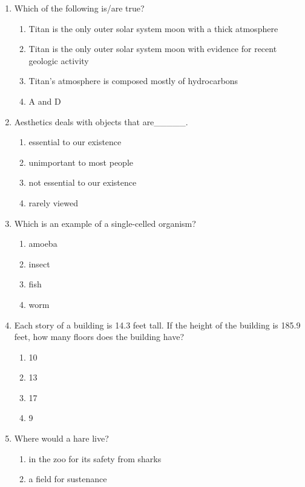 \documentclass[12pt]{article}
\begin{document}
\begin{enumerate}[label=\arabic*.]
\begin{enumerate}[label=(\alph*)]
    \item Lesbians were omitted from the study.
    \item all of the above
\end{enumerate}
\item Which of the following is/are true?
\begin{enumerate}[label=(\alph*)]
    \item Titan is the only outer solar system moon with a thick atmosphere
    \item Titan is the only outer solar system moon with evidence for recent geologic activity
    \item Titan's atmosphere is composed mostly of hydrocarbons
    \item A and D
\end{enumerate}
\item Aesthetics deals with objects that are\_\_\_\_\_.
\begin{enumerate}[label=(\alph*)]
    \item essential to our existence
    \item unimportant to most people
    \item not essential to our existence
    \item rarely viewed
\end{enumerate}
\item Which is an example of a single-celled organism?
\begin{enumerate}[label=(\alph*)]
    \item amoeba
    \item insect
    \item fish
    \item worm
\end{enumerate}
\item Each story of a building is 14.3 feet tall. If the height of the building is 185.9 feet, how many floors does the building have?
\begin{enumerate}[label=(\alph*)]
    \item 10
    \item 13
    \item 17
    \item 9
\end{enumerate}
\item Where would a hare live?
\begin{enumerate}[label=(\alph*)]
    \item in the zoo for its safety from sharks
    \item a field for sustenance

\end{enumerate}
\end{enumerate}
\end{document}
